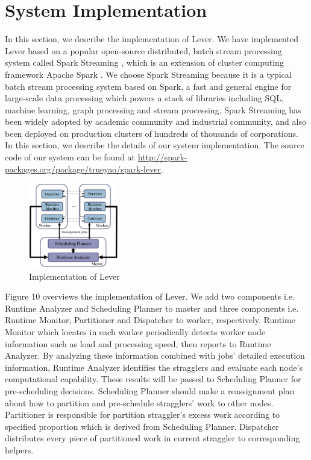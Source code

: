 \section{System Implementation}

  In this section, we describe the implementation of Lever. We have implemented Lever based on a popular open-source distributed, batch stream processing system called Spark Streaming \cite{spark-streaming}, which is an extension of cluster computing framework Apache Spark \cite{spark}. We choose Spark Streaming because it is a typical batch stream processing system based on Spark, a fast and general engine for large-scale data processing which powers a stack of libraries including SQL, machine learning, graph processing and stream processing. Spark Streaming has been widely adopted by academic community and industrial community, and also been deployed on production clusters of hundreds of thousands of corporations. In this section, we describe the details of our system implementation. The source code of our system can be found at \url{http://spark-packages.org/package/trueyao/spark-lever}.
  \begin{figure}[htbp]
    \centering
    \includegraphics[width=0.35\textwidth]{Figure7}
    \caption{Implementation of Lever}
    \label{Fig. 10:}
  \end{figure}

  Figure 10 overviews the implementation of Lever. We add two components i.e. Runtime Analyzer and Scheduling Planner to master and three components i.e. Runtime Monitor, Partitioner and Dispatcher to worker, respectively. Runtime Monitor which locates in each worker periodically detects worker node information such as load and processing speed, then reports to Runtime Analyzer. By analyzing these information combined with jobs' detailed execution information, Runtime Analyzer identifies the stragglers and evaluate each node's computational capability. These results will be passed to Scheduling Planner for pre-scheduling decisions. Scheduling Planner should make a reassignment plan about how to partition and pre-schedule stragglers' work to other nodes. Partitioner is responsible for partition straggler's excess work according to specified proportion which is derived from Scheduling Planner. Dispatcher distributes every piece of partitioned work in current straggler to corresponding helpers.

